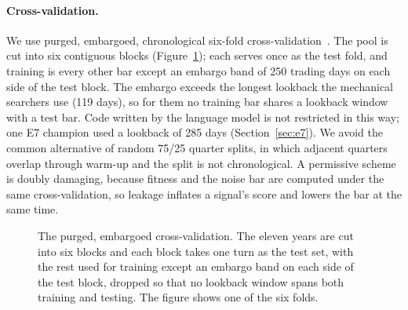 \documentclass[11pt]{article}
\begin{document}
\paragraph{Cross-validation.} We use purged, embargoed, chronological six-fold cross-validation~\cite{deprado}. The
pool is cut into six contiguous blocks (Figure~\ref{fig:cv}); each serves once as the test fold, and training is every
other bar except an embargo band of 250 trading days on each side of the test block. The embargo
exceeds the longest lookback the mechanical searchers use (119 days), so for them no training bar shares
a lookback window with a test bar. Code written by the language model is not restricted in this way; one
E7 champion used a lookback of 285 days (Section~\ref{sec:e7}). We
avoid the common alternative of random 75/25 quarter splits, in which adjacent quarters overlap
through warm-up and the split is not chronological. A permissive scheme is doubly damaging, because
fitness and the noise bar are computed under the same cross-validation, so leakage inflates a
signal's score and lowers the bar at the same time.

\begin{figure}[htbp]
\centering
{}
\caption{The purged, embargoed cross-validation. The eleven years are cut into six blocks and each block
takes one turn as the test set, with the rest used for training except an embargo band on each side of
the test block, dropped so that no lookback window spans both training and testing. The figure shows one
of the six folds.}
\label{fig:cv}
\end{figure}
\end{document}

